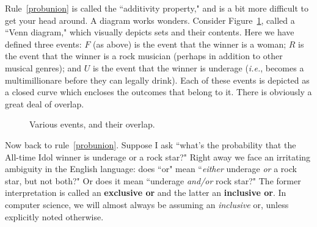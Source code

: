 Rule~\ref{probunion} is called the ``additivity property," and is a bit
more difficult to get your head around. A diagram works wonders. Consider
Figure~\ref{venn}, called a ``Venn diagram," which visually depicts sets
and their contents. Here we have defined three events: $F$ (as above) is
the event that the winner is a woman; $R$ is the event that the winner is a
rock musician (perhaps in addition to other musical genres); and $U$ is the
event that the winner is underage (\textit{i.e.}, becomes a multimillionare
before they can legally drink). Each of these events is depicted as a
closed curve which encloses the outcomes that belong to it. There is
obviously a great deal of overlap.

\begin{figure}[ht]
\centering
{}
\caption{Various events, and their overlap.}
\label{venn}
\end{figure}

Now back to rule~\ref{probunion}. Suppose I ask ``what's the probability
that the All-time Idol winner is underage or a rock star?" Right
away we face an irritating ambiguity in the English language: does ``or"
mean ``\textit{either} underage \textit{or} a rock star, but not both?" Or
does it mean ``underage \textit{and/or} rock star?" The former
interpretation is called an \textbf{exclusive or} and the latter an
\textbf{inclusive or}. In computer science, we will almost always be
assuming an \textit{inclusive} or, unless explicitly noted otherwise.

